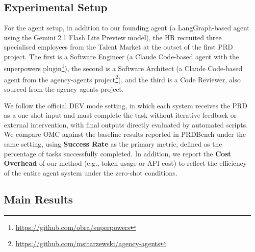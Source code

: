 \documentclass[11pt,a4paper]{article}
\begin{document}
\subsection{Experimental Setup}

For the agent setup, in addition to our founding agent (a LangGraph-based agent using the Gemini 2.1 Flash Lite Preview model), the HR recruited three specialised employees from the Talent Market at the outset of the first PRD project. The first is a Software Engineer (a Claude Code-based agent with the superpowers plugin\footnote{\url{https://github.com/obra/superpowers}}), the second is a Software Architect (a Claude Code-based agent from the agency-agents project\footnote{\url{https://github.com/msitarzewski/agency-agents}}), and the third is a Code Reviewer, also sourced from the agency-agents project.

We follow the official DEV mode setting, in which each system receives the PRD as a one-shot input and must complete the task without iterative feedback or external intervention, with final outputs directly evaluated by automated scripts. We compare OMC against the baseline results reported in PRDBench under the same setting, using \textbf{Success Rate} as the primary metric, defined as the percentage of tasks successfully completed. In addition, we report the \textbf{Cost Overhead} of our method (e.g., token usage or API cost) to reflect the efficiency of the entire agent system under the zero-shot conditions.

\subsection{Main Results}
\end{document}
